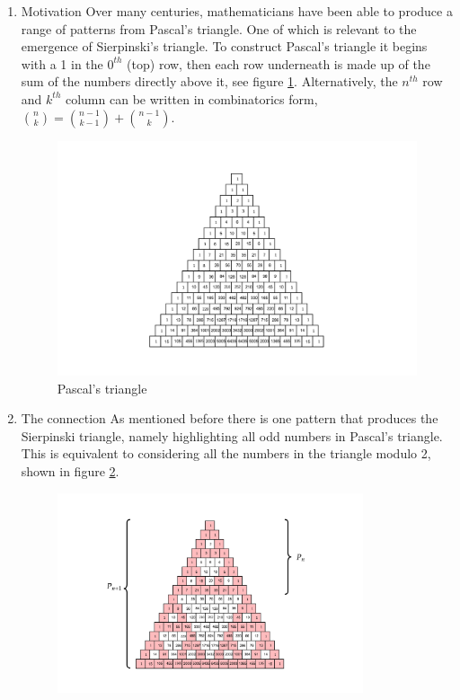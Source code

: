 \documentclass[11pt]{article}
\begin{document}
\begin{enumerate}
\item Motivation
\label{sec:org681cded}
Over many centuries, mathematicians have been able to produce a range of patterns from Pascal's triangle. One of which is relevant to the emergence of Sierpinski's triangle. To construct Pascal's triangle it begins with a 1 in the \(0^{th}\) (top) row, then each row underneath is made up of the sum of the numbers directly above it, see figure \ref{fig:pascal-triangle}. Alternatively, the \(n^{th}\) row and \(k^{th}\) column can be written in combinatorics form, \(\binom{n}{k} = \binom{n-1}{k-1} + \binom{n-1}{k}\).

\begin{figure}[htbp]
\centering
\includegraphics[width=.9\linewidth]{media/tikz/pascals-triangle.png}
\caption{\label{fig:pascal-triangle}Pascal's triangle}
\end{figure}

\item The connection
\label{sec:orgabc2e27}
As mentioned before there is one pattern that produces the Sierpinski triangle, namely highlighting all odd numbers in Pascal's triangle. This is equivalent to considering all the numbers in the triangle modulo 2, shown in figure \ref{fig:pascal-sierpinski-tri}.

\begin{figure}[htbp]
\centering
\includegraphics[width=9cm]{media/tikz/pascal-sierpinski-tri.png}
\label{fig:pascal-sierpinski-tri}
\end{figure}


\end{enumerate}
\end{document}
